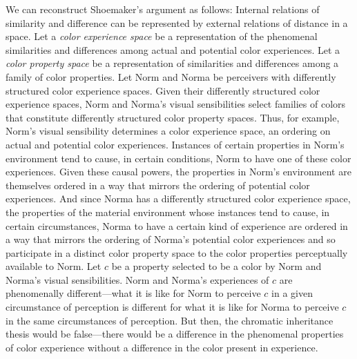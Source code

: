 \documentclass[12pt]{article}
\begin{document}
We can reconstruct Shoemaker's argument as follows: Internal relations of similarity and difference can be represented by external relations of distance in a space. Let a \emph{color experience space} be a representation of the phenomenal similarities and differences among actual and potential color experiences. Let a \emph{color property space} be a representation of similarities and differences among a family of color properties. Let Norm and Norma be perceivers with differently structured color experience spaces. Given their differently structured color experience spaces, Norm and Norma's visual sensibilities select families of colors that constitute differently structured color property spaces. Thus, for example, Norm's visual sensibility determines a color experience space, an ordering on actual and potential color experiences. Instances of certain properties in Norm's environment tend to cause, in certain conditions, Norm to have one of these color experiences. Given these causal powers, the properties in Norm's environment are themselves ordered in a way that mirrors the ordering of potential color experiences. And since Norma has a differently structured color experience space, the properties of the material environment whose instances tend to cause, in certain circumstances, Norma to have a certain kind of experience are ordered in a way that mirrors the ordering of Norma's potential color experiences and so participate in a distinct color property space to the color properties perceptually available to Norm. Let $c$ be a property selected to be a color by Norm and Norma's visual sensibilities. Norm and Norma's experiences of $c$ are phenomenally different---what it is like for Norm to perceive $c$ in a given circumstance of perception is different for what it is like for Norma to perceive $c$ in the same circumstances of perception. But then, the chromatic inheritance thesis would be false---there would be a difference in the phenomenal properties of color experience without a difference in the color present in experience.
\end{document}
